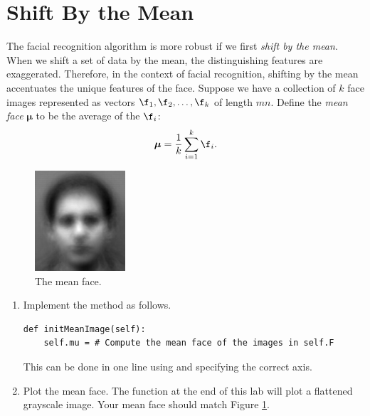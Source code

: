 \section*{Shift By the Mean}

The facial recognition algorithm is more robust if we first \emph{shift by the mean}. When we shift a set of data by the mean, the distinguishing features are exaggerated. Therefore, in the context of facial recognition, shifting by the mean accentuates the unique features of the face.
Suppose we have a collection of $k$ face images represented as vectors $\f_1, \f_2, \ldots, \f_k$ of length $mn$.
Define the \emph{mean face} ${\boldsymbol \mu}$ to be the average of the $\f_i$:
\[
{\boldsymbol \mu} = \frac{1}{k}\sum_{i=1}^k \f_i.
\]
\begin{figure}
\includegraphics[width=0.3\textwidth]{meanFace.png}
\caption{The mean face.}
\label{facialRecognition:meanFace}
\end{figure}

\begin{problem}
\label{prob:meanFace}
\leavevmode
\begin{enumerate}
\item Implement the method  as follows.
\begin{lstlisting}
def initMeanImage(self):
    self.mu = # Compute the mean face of the images in self.F
\end{lstlisting}
This can be done in one line using  and specifying the correct axis.

\item Plot the mean face. 
The function  at the end of this lab will plot a flattened grayscale image.
Your mean face should match Figure \ref{facialRecognition:meanFace}.
\end{enumerate}
\end{problem}



